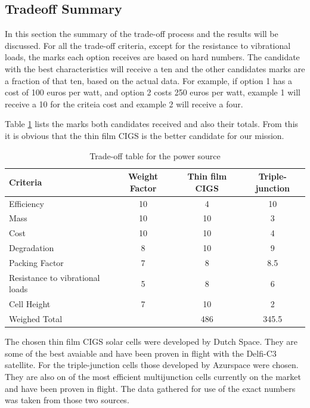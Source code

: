 \subsection{Tradeoff Summary}
In this section the summary of the trade-off process and the results will be discussed. For all the trade-off criteria, except for the resistance to vibrational loads, the marks each option receives are based on hard numbers. The candidate with the best characteristics will receive a ten and the other candidates marks are a fraction of that ten, based on the actual data. For example, if option 1 has a cost of 100 euros per watt, and option 2 costs 250 euros per watt, example 1 will receive a 10 for the criteia cost and example 2 will receive a four.

Table \ref{tab:TO_summary} lists the marks both candidates received and also their totals. From this it is obvious that the thin film \ac{CIGS} is the better candidate for our mission.

\begin{table}
\begin{tabular}{l|c|c|c}
 \textbf{Criteria} & \textbf{Weight Factor} & \textbf{Thin film CIGS} & \textbf{Triple-junction} \\ \hline 
  \hline
 Efficiency & 10 & 4 & 10 \\ 
 Mass & 10 & 10 & 3 \\ 
 Cost & 10 & 10 & 4 \\ 
 Degradation & 8 & 10 & 9 \\ 
 Packing Factor & 7 & 8 & 8.5 \\ 
 Resistance to vibrational loads & 5 & 8 & 6 \\ 
 Cell Height & 7 & 10 & 2 \\ 
 \hline
 Weighed Total & & 486 & 345.5 \\ 
 \end{tabular}
 \caption{Trade-off table for the power source}
 \label{tab:TO_summary}
 \end{table}
 
The chosen thin film CIGS solar cells were developed by Dutch Space. They are some of the best avaiable and have been proven in flight with the Delfi-C3 satellite. For the triple-junction cells those developed by Azurspace were chosen. They are also on of the most efficient multijunction cells currently on the market and have been proven in flight. The data gathered for use of the exact numbers was taken from those two sources.

